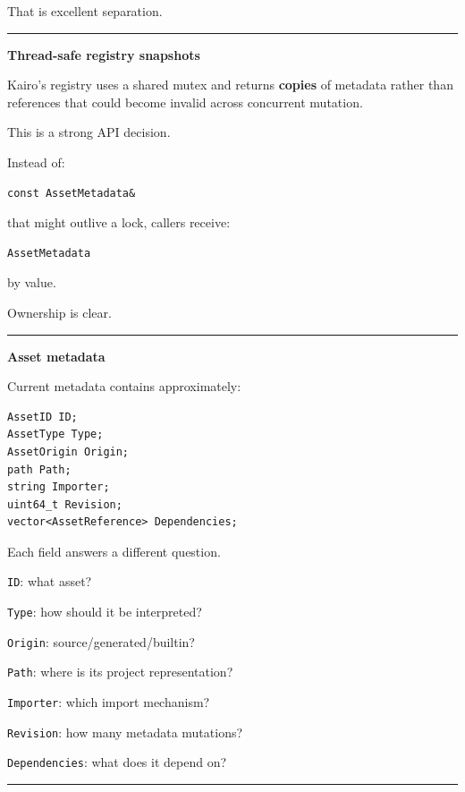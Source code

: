 That is excellent separation.

\begin{center}\rule{0.5\linewidth}{0.5pt}\end{center}

\textbf{Thread-safe registry snapshots}

Kairo's registry uses a shared mutex and returns \textbf{copies} of metadata rather than references that could become invalid across concurrent mutation.

This is a strong API decision.

Instead of:

\begin{verbatim}
const AssetMetadata&
\end{verbatim}

that might outlive a lock, callers receive:

\begin{verbatim}
AssetMetadata
\end{verbatim}

by value.

Ownership is clear.

\begin{center}\rule{0.5\linewidth}{0.5pt}\end{center}

\textbf{Asset metadata}

Current metadata contains approximately:

\begin{verbatim}
AssetID ID;
AssetType Type;
AssetOrigin Origin;
path Path;
string Importer;
uint64_t Revision;
vector<AssetReference> Dependencies;
\end{verbatim}

Each field answers a different question.

\texttt{ID}: what asset?

\texttt{Type}: how should it be interpreted?

\texttt{Origin}: source/generated/builtin?

\texttt{Path}: where is its project representation?

\texttt{Importer}: which import mechanism?

\texttt{Revision}: how many metadata mutations?

\texttt{Dependencies}: what does it depend on?

\begin{center}\rule{0.5\linewidth}{0.5pt}\end{center}

